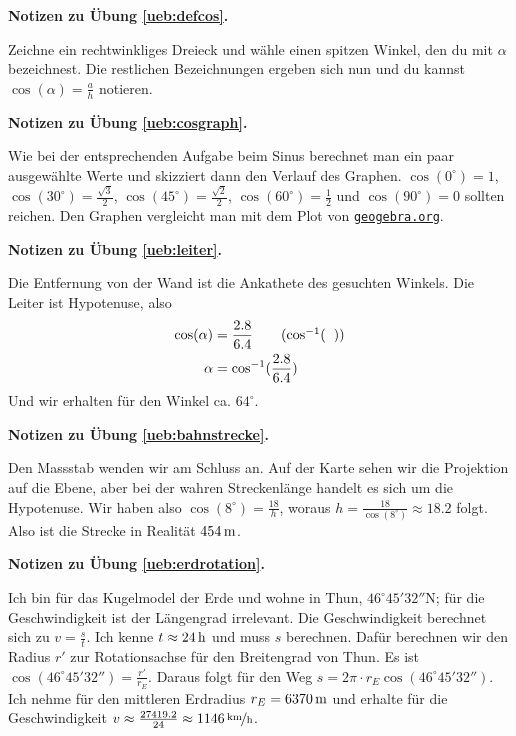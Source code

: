 \documentclass[%
11pt,%
twoside,%
titlepage,%
swissgerman,%
headsepline%
]{scrartcl}
\newcommand{\faReturnGray}{\textcolor{gray}{\faMailReply}} %
\newcommand{\geogebralink}{\href{https://www.geogebra.org/calculator}{\texttt{geogebra.org}}}
\theoremstyle{definition}
\theoremstyle{plain}
\newcommand{\concatueb}[1]{ueb:#1}%
\newcommand{\concatlsg}[1]{lsg:#1}%
\newenvironment{lsg}[1]{%
    \par\noindent\textbf{Notizen zu Übung \ref{\concatueb{#1}}.}%
    \label{\concatlsg{#1}} %
    \hfill\hyperref[\concatueb{#1}]{\faReturnGray}\par %
}{%
    \par%
}
\begin{document}
\begin{lsg}{defcos}
Zeichne ein rechtwinkliges Dreieck und w\"ahle einen spitzen Winkel, den du mit $\alpha$ bezeichnest. Die restlichen Bezeichnungen ergeben sich nun und du kannst $\cos(\alpha)=\frac{a}{h}$ notieren.
\end{lsg}

\begin{lsg}{cosgraph}
Wie bei der entsprechenden Aufgabe beim Sinus berechnet man ein paar ausgew\"ahlte Werte und skizziert dann den Verlauf des Graphen. $\cos(0^{\circ})=1$, $\cos(30^{\circ})=\frac{\sqrt{3}}{2}$, $\cos(45^{\circ})=\frac{\sqrt{2}}{2}$, $\cos(60^{\circ})=\frac{1}{2}$ und $\cos(90^{\circ})=0$ sollten reichen. Den Graphen vergleicht man mit dem Plot von \geogebralink .
\end{lsg}

\begin{lsg}{leiter}
Die Entfernung von der Wand ist die Ankathete des gesuchten Winkels. Die Leiter ist Hypotenuse, also
\begin{align*}
\cos(\alpha) &= \frac{2.8}{6.4}\tag{$\cos^{-1}(\phantom{x})$}\\
\alpha &= \cos^{-1}(\frac{2.8}{6.4})
\end{align*}
Und wir erhalten f\"ur den Winkel ca. $64^{\circ}$.
\end{lsg}

\begin{lsg}{bahnstrecke}
Den Massstab wenden wir am Schluss an. Auf der Karte sehen wir die Projektion auf die Ebene, aber bei der wahren Streckenl\"ange handelt es sich um die Hypotenuse. Wir haben also $\cos(8^{\circ})=\frac{18}{h}$, woraus $h=\frac{18}{\cos(8^{\circ})}\approx18.2$ folgt. Also ist die Strecke in Realit\"at $\unit[454]{m}$.
\end{lsg}

\begin{lsg}{erdrotation}
Ich bin f\"ur das Kugelmodel der Erde und wohne in Thun, $46^{\circ}45'32''$N; f\"ur die Geschwindigkeit ist der L\"angengrad irrelevant. Die Geschwindigkeit berechnet sich zu $v=\frac{s}{t}$. Ich kenne $t\approx\unit[24]{h}$ und muss $s$ berechnen. Daf\"ur berechnen wir den Radius $r'$ zur Rotationsachse f\"ur den Breitengrad von Thun. Es ist $\cos(46^{\circ}45'32'')=\frac{r'}{r_{E}}$. Daraus folgt f\"ur den Weg $s=2\pi\cdot r_{E}\cos(46^{\circ}45'32'')$. Ich nehme f\"ur den mittleren Erdradius $r_{E}=\unit[6370]{m}$ und erhalte f\"ur die Geschwindigkeit $v\approx\frac{27419.2}{24}\approx\unitfrac[1146]{km}{h}$.
\end{lsg}
\end{document}
